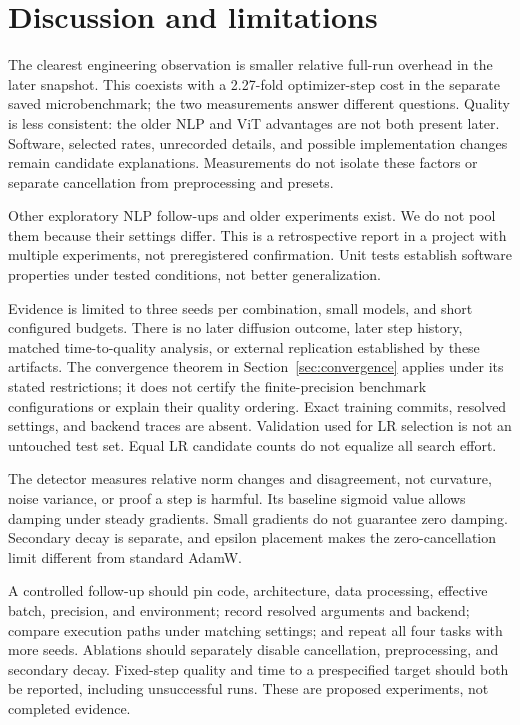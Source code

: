 \documentclass[11pt,a4paper]{article}
\theoremstyle{definition}
\theoremstyle{remark}
\begin{document}
\section{Discussion and limitations}

The clearest engineering observation is smaller relative full-run overhead in the later snapshot. This coexists with a 2.27-fold optimizer-step cost in the separate saved microbenchmark; the two measurements answer different questions. Quality is less consistent: the older NLP and ViT advantages are not both present later. Software, selected rates, unrecorded  details, and possible implementation changes remain candidate explanations. Measurements do not isolate these factors or separate cancellation from preprocessing and presets.

Other exploratory NLP follow-ups and older experiments exist. We do not pool them because their settings differ. This is a retrospective report in a project with multiple experiments, not preregistered confirmation. Unit tests establish software properties under tested conditions, not better generalization.

Evidence is limited to three seeds per combination, small models, and short configured budgets. There is no later diffusion outcome, later step history, matched time-to-quality analysis, or external replication established by these artifacts. The convergence theorem in Section~\ref{sec:convergence} applies under its stated restrictions; it does not certify the finite-precision benchmark configurations or explain their quality ordering. Exact training commits, resolved settings, and backend traces are absent. Validation used for LR selection is not an untouched test set. Equal LR candidate counts do not equalize all search effort.

The detector measures relative norm changes and disagreement, not curvature, noise variance, or proof a step is harmful. Its baseline sigmoid value allows damping under steady gradients. Small gradients do not guarantee zero damping. Secondary decay is separate, and epsilon placement makes the zero-cancellation limit different from standard AdamW.

A controlled follow-up should pin code, architecture, data processing, effective batch, precision, and environment; record resolved arguments and backend; compare execution paths under matching settings; and repeat all four tasks with more seeds. Ablations should separately disable cancellation, preprocessing, and secondary decay. Fixed-step quality and time to a prespecified target should both be reported, including unsuccessful runs. These are proposed experiments, not completed evidence.
\end{document}
